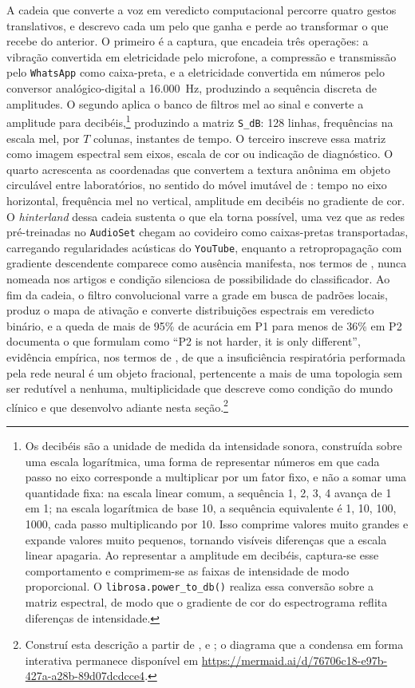 A cadeia que converte a voz em veredicto computacional percorre quatro gestos translativos, e descrevo cada um pelo que ganha e perde ao transformar o que recebe do anterior. O primeiro é a captura, que encadeia três operações: a vibração convertida em eletricidade pelo microfone, a compressão e transmissão pelo \texttt{WhatsApp} como caixa-preta, e a eletricidade convertida em números pelo conversor analógico-digital a 16.000~Hz, produzindo a sequência discreta de amplitudes. O segundo aplica o banco de filtros mel ao sinal e converte a amplitude para decibéis,\footnote{Os decibéis são a unidade de medida da intensidade sonora, construída sobre uma escala logarítmica, uma forma de representar números em que cada passo no eixo corresponde a multiplicar por um fator fixo, e não a somar uma quantidade fixa: na escala linear comum, a sequência 1, 2, 3, 4 avança de 1 em 1; na escala logarítmica de base 10, a sequência equivalente é 1, 10, 100, 1000, cada passo multiplicando por 10. Isso comprime valores muito grandes e expande valores muito pequenos, tornando visíveis diferenças que a escala linear apagaria. Ao representar a amplitude em decibéis, captura-se esse comportamento e comprimem-se as faixas de intensidade de modo proporcional. O \texttt{librosa.power\_to\_db()} realiza essa conversão sobre a matriz espectral, de modo que o gradiente de cor do espectrograma reflita diferenças de intensidade.} produzindo a matriz \texttt{S\_dB}: 128 linhas, frequências na escala mel, por $T$ colunas, instantes de tempo. O terceiro inscreve essa matriz como imagem espectral sem eixos, escala de cor ou indicação de diagnóstico. O quarto acrescenta as coordenadas que convertem a textura anônima em objeto circulável entre laboratórios, no sentido do móvel imutável de \textcite{Latour1986Visualization}: tempo no eixo horizontal, frequência mel no vertical, amplitude em decibéis no gradiente de cor. O \textit{hinterland} dessa cadeia sustenta o que ela torna possível, uma vez que as redes pré-treinadas no \texttt{AudioSet} chegam ao covideiro como caixas-pretas transportadas, carregando regularidades acústicas do \texttt{YouTube}, enquanto a retropropagação com gradiente descendente comparece como ausência manifesta, nos termos de \textcite{Law2004After}, nunca nomeada nos artigos e condição silenciosa de possibilidade do classificador. Ao fim da cadeia, o filtro convolucional varre a grade em busca de padrões locais, produz o mapa de ativação e converte distribuições espectrais em veredicto binário, e a queda de mais de 95\% de acurácia em P1 para menos de 36\% em P2 documenta o que \textcite{Gauy2024Discriminant} formulam como \enquote{P2 is not harder, it is only different}, evidência empírica, nos termos de \textcite{LawHassard1999ANT}, de que a insuficiência respiratória performada pela rede neural é um objeto fracional, pertencente a mais de uma topologia sem ser redutível a nenhuma, multiplicidade que \textcite{mol2002body} descreve como condição do mundo clínico e que desenvolvo adiante nesta seção.\footnote{Construí esta descrição a partir de \textcite{Casanova2021DeepLearning}, \textcite{Gauy2024Discriminant} e \textcite{Latour2017Esperanca}; o diagrama que a condensa em forma interativa permanece disponível em \url{https://mermaid.ai/d/76706c18-e97b-427a-a28b-89d07dcdcce4}.}

